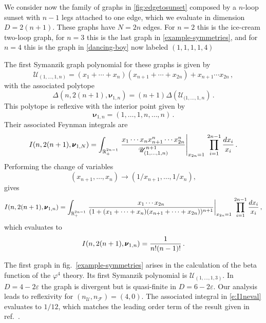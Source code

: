 \documentclass[12pt,a4paper]{article}
\theoremstyle{plain}
\theoremstyle{remark}
\newcommand{\nprops}{N}
\newcommand{\cU}{\mathscr {U}}
\newcommand{\cF}{\mathscr {F}}
\newcommand{\undernotation}[1]{\pmb{#1}}
\newcommand{\Newton}{\Delta}
\begin{document}
We consider now the family of graphs in \cref{fig:edgetosunset} composed by a $n$-loop sunset with $n-1$ legs attached to one edge, which we evaluate in dimension $D=2(n+1)$. These graphs have $\nprops=2n$ edges. For $n=2$ this is the ice-cream two-loop graph, for $n=3$ this is the last graph in \cref{example-symmetries}, and for $n=4$ this is the graph in \cref{dancing-boy} now labeled $(1,1,1,1,4)$

The first Symanzik graph polynomial for these graphs is given by
\begin{equation}
    \cU_{(1,\dots,1,n)}=(x_1+\cdots+x_{n})(x_{n+1}+\cdots+x_{2n})+x_{n+1}\cdots x_{2n}\,,
\end{equation}
with the associated  polytope 
\begin{equation}
  \Newton(n,2(n+1),\undernotation{\nu}_{1,n}) =(n+1) \Delta(\cU_{(1,\dots,1,n}) \, .
\end{equation}
This polytope is reflexive with the interior point given by
\begin{equation}
    \undernotation{\nu}_{1,n}=(1,\dots,1,n, \dots, n)\,.
\end{equation}
Their associated Feynman integrals are
\begin{equation}
    \label{e:In} I(n,2(n+1),\undernotation{\nu}_{1,N})=\int_{\mathbb R_+^{2n-1}}  \left.{x_1\cdots x_{n} x_{n+1}^{n}\cdots x_{2n}^{n} \over \cU_{(1,\dots,1,n)}^{n+1}}\right|_{x_{2n}=1}\,\prod_{i=1}^{2n-1}{dx_i\over x_i}\,.
\end{equation}
Performing the change of variables
\begin{equation}
    (x_{n+1},\dots,x_{n})\to  (1/x_{n+1},\dots,1/x_{n}),
\end{equation}
gives
\begin{equation}  I(n,2(n+1),\undernotation{\nu}_{1,n})=\int_{\mathbb R_+^{2n-1}}  \left.{x_1\cdots x_{2n}\over (1+(x_1+\cdots+x_{n})(x_{n+1}+\cdots +x_{2n}))^{n+1}}\right|_{x_{2n}=1}\,\prod_{i=1}^{2n-1}{dx_i\over x_i}\,,
\end{equation}
which evaluates to 
\begin{equation}\label{e:I1neval}
    I(n,2(n+1),\undernotation{\nu}_{1,n})={1\over n! (n-1)!}\,.
\end{equation}

\medskip

The first graph in fig.~\ref{example-symmetries} arises in the calculation of the beta function of the $\varphi^4$ theory. Its first Symanzik polynomial is $\cU_{(1,\dots,1,3)}$.  In $D=4-2\varepsilon$ the graph  is divergent but is quasi-finite   in $D=6-2\varepsilon$. Our analysis leads to  reflexivity for $(n_\cU, n_\cF)=(4,0)$.  The associated integral in \cref{e:I1neval} evaluates to $1/12$, which matches the leading order term of the result given in ref.~\cite{Kompaniets:2017yct}. 
\end{document}
